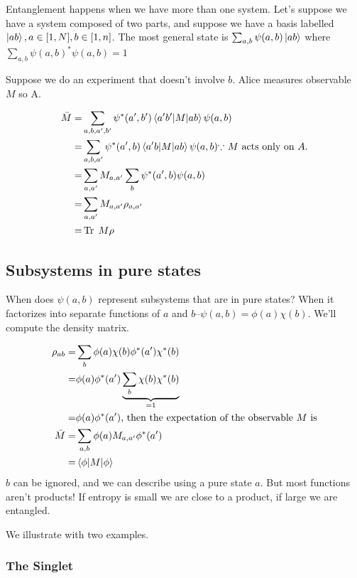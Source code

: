 \documentclass[]{article}
\DeclareMathOperator{\Tr}{Tr \;}
\begin{document}
Entanglement happens when we have more than one system. Let's suppose we have a system composed of two parts, and suppose we have a basis labelled $\ket{ab}, a \in [1,N], b \in [1,n]$. The most general state is $\sum_{a,b}\psi(a,b)\ket{ab}$ where $\sum_{a,b}\psi(a,b)^*\psi(a,b)=1$

Suppose we do an experiment that doesn't involve $b$. Alice measures observable $M$ so A.

\begin{align*}
	\bar{M}=&\sum_{a,b,a^{\prime},b^{\prime}}\psi^*(a^{\prime},b^{\prime})\braket{a^{\prime}b^{\prime}\vert M \vert ab} \psi(a,b)\\
	=&\sum_{a,b,a^{\prime}}\psi^*(a^{\prime},b)\braket{a^{\prime}b\vert M \vert ab} \psi(a,b) \text{$\because$ $M$ acts only on $A$.}\\
	=& \sum_{a,a^{\prime}}  M_{a,a^\prime} \sum_b \psi^*(a^{\prime},b) \psi(a,b)\\
	=& \sum_{a,a^{\prime}}  M_{a,a^\prime} \rho_{a,a^\prime}\\
	=& \Tr M \rho
\end{align*} 



\subsection{Subsystems in pure states}
When does $\psi(a,b)$ represent subsystems that are in pure states? When it factorizes into separate functions of $a$ and $b$--$\psi(a,b)=\phi(a) \chi(b)$. We'll compute the density matrix.

\begin{align*}
	\rho_{ab} =& \sum_b \phi(a) \chi(b) \phi^*(a^\prime) \chi^*(b)\\
	=& \phi(a) \phi^*(a^\prime) \underbrace{\sum_b  \chi(b)  \chi^*(b)}_\text{=1}\\
	=& \phi(a) \phi^*(a^\prime) \text{, then the expectation of the observable $M$ is}\\
	\bar{M} =& \sum_{a,b}\phi(a) M_{a,a^\prime}\phi^*(a^\prime)\\
	=& \braket{\phi\vert M\vert \phi}
\end{align*}
$b$ can be ignored, and we can describe using a pure state $a$. But most functions aren't products! If entropy is small we are close to a product, if large we are entangled.

We illustrate with two examples.

\subsubsection{The Singlet}
\end{document}
